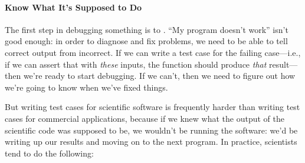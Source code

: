 \documentclass{book}
\begin{document}
\mbox{}\paragraph{Know What It's Supposed to Do}

The first step in debugging something is to
. ``My program doesn't work'' isn't good enough: in order
to diagnose and fix problems, we need to be able to tell correct output
from incorrect. If we can write a test case for the failing case---i.e.,
if we can assert that with \emph{these} inputs, the function should
produce \emph{that} result--- then we're ready to start debugging. If we
can't, then we need to figure out how we're going to know when we've
fixed things.

But writing test cases for scientific software is frequently harder than
writing test cases for commercial applications, because if we knew what
the output of the scientific code was supposed to be, we wouldn't be
running the software: we'd be writing up our results and moving on to
the next program. In practice, scientists tend to do the following:
\end{document}
